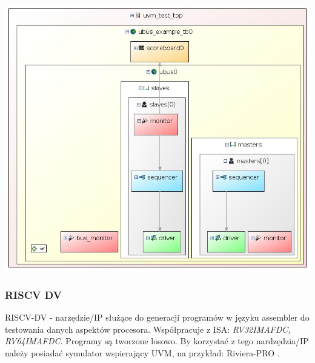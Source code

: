 \documentclass[11pt,a4paper]{article}
\begin{document}
			\begin{samepage}
				\nopagebreak
				\begin{center}
					\includegraphics[width=14cm]{./rysunki/uvm_graph.jpg}
				\end{center}
			\end{samepage}
		\subsubsection{RISCV DV}
		\hspace{5mm}
			RISCV-DV - narzędzie/IP służące do generacji programów w języku assembler do testowania danych aspektów procesora. Współpracuje z ISA: \textit{RV32IMAFDC, RV64IMAFDC}. Programy są tworzone losowo. By korzystać z tego nardzędzia/IP należy posiadać symulator wspierający UVM, na przykład: Riviera-PRO \cite{google_dv}.
\end{document}
